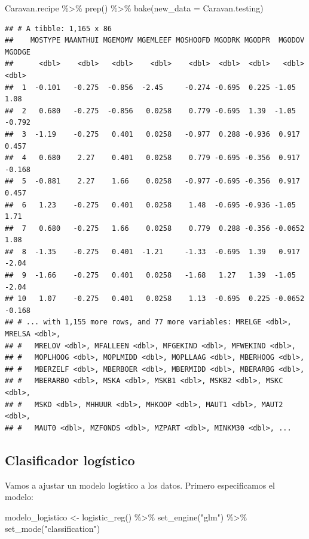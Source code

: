 \documentclass[
  12pt,
]{book}
\newenvironment{Shaded}{\begin{snugshade}}{\end{snugshade}}
\newcommand{\AttributeTok}[1]{\textcolor[rgb]{0.77,0.63,0.00}{#1}}
\newcommand{\FunctionTok}[1]{\textcolor[rgb]{0.00,0.00,0.00}{#1}}
\newcommand{\NormalTok}[1]{#1}
\newcommand{\OtherTok}[1]{\textcolor[rgb]{0.56,0.35,0.01}{#1}}
\newcommand{\SpecialCharTok}[1]{\textcolor[rgb]{0.00,0.00,0.00}{#1}}
\newcommand{\StringTok}[1]{\textcolor[rgb]{0.31,0.60,0.02}{#1}}
\theoremstyle{definition}
\theoremstyle{definition}
\theoremstyle{definition}
\theoremstyle{definition}
\theoremstyle{remark}
\begin{document}
\begin{Shaded}
\begin{Highlighting}[]
\NormalTok{Caravan.recipe }\SpecialCharTok{\%\textgreater{}\%}
    \FunctionTok{prep}\NormalTok{() }\SpecialCharTok{\%\textgreater{}\%}
    \FunctionTok{bake}\NormalTok{(}\AttributeTok{new\_data =}\NormalTok{ Caravan.testing)}
\end{Highlighting}
\end{Shaded}

\begin{verbatim}
## # A tibble: 1,165 x 86
##    MOSTYPE MAANTHUI MGEMOMV MGEMLEEF MOSHOOFD MGODRK MGODPR  MGODOV MGODGE
##      <dbl>    <dbl>   <dbl>    <dbl>    <dbl>  <dbl>  <dbl>   <dbl>  <dbl>
##  1  -0.101   -0.275  -0.856  -2.45     -0.274 -0.695  0.225 -1.05    1.08 
##  2   0.680   -0.275  -0.856   0.0258    0.779 -0.695  1.39  -1.05   -0.792
##  3  -1.19    -0.275   0.401   0.0258   -0.977  0.288 -0.936  0.917   0.457
##  4   0.680    2.27    0.401   0.0258    0.779 -0.695 -0.356  0.917  -0.168
##  5  -0.881    2.27    1.66    0.0258   -0.977 -0.695 -0.356  0.917   0.457
##  6   1.23    -0.275   0.401   0.0258    1.48  -0.695 -0.936 -1.05    1.71 
##  7   0.680   -0.275   1.66    0.0258    0.779  0.288 -0.356 -0.0652  1.08 
##  8  -1.35    -0.275   0.401  -1.21     -1.33  -0.695  1.39   0.917  -2.04 
##  9  -1.66    -0.275   0.401   0.0258   -1.68   1.27   1.39  -1.05   -2.04 
## 10   1.07    -0.275   0.401   0.0258    1.13  -0.695  0.225 -0.0652 -0.168
## # ... with 1,155 more rows, and 77 more variables: MRELGE <dbl>, MRELSA <dbl>,
## #   MRELOV <dbl>, MFALLEEN <dbl>, MFGEKIND <dbl>, MFWEKIND <dbl>,
## #   MOPLHOOG <dbl>, MOPLMIDD <dbl>, MOPLLAAG <dbl>, MBERHOOG <dbl>,
## #   MBERZELF <dbl>, MBERBOER <dbl>, MBERMIDD <dbl>, MBERARBG <dbl>,
## #   MBERARBO <dbl>, MSKA <dbl>, MSKB1 <dbl>, MSKB2 <dbl>, MSKC <dbl>,
## #   MSKD <dbl>, MHHUUR <dbl>, MHKOOP <dbl>, MAUT1 <dbl>, MAUT2 <dbl>,
## #   MAUT0 <dbl>, MZFONDS <dbl>, MZPART <dbl>, MINKM30 <dbl>, ...
\end{verbatim}

\hypertarget{clasificador-loguxedstico}{%
\subsection{Clasificador logístico}\label{clasificador-loguxedstico}}

Vamos a ajustar un modelo logístico a los datos. Primero especificamos el modelo:

\begin{Shaded}
\begin{Highlighting}[]
\NormalTok{modelo\_logistico }\OtherTok{\textless{}{-}} \FunctionTok{logistic\_reg}\NormalTok{() }\SpecialCharTok{\%\textgreater{}\%}
    \FunctionTok{set\_engine}\NormalTok{(}\StringTok{"glm"}\NormalTok{) }\SpecialCharTok{\%\textgreater{}\%}
    \FunctionTok{set\_mode}\NormalTok{(}\StringTok{"classification"}\NormalTok{)}
\end{Highlighting}
\end{Shaded}
\end{document}
